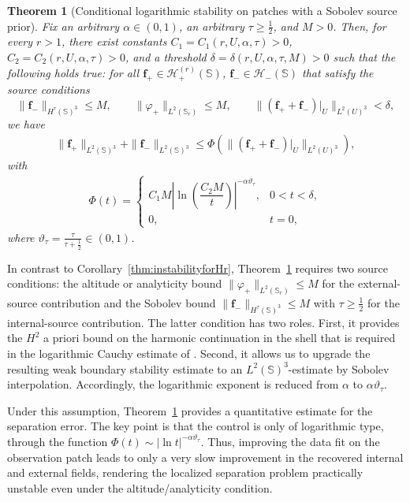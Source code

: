 \documentclass[a4paper, 11pt]{article}
\newtheorem{theorem}{Theorem}
\renewcommand{\SS}{\mathbb{S}}
\newcommand{\f}{\mathbf{f}}
\begin{document}
\begin{theorem}[Conditional logarithmic stability on patches with a Sobolev source prior] \label{thm:condstab}
{
	Fix an arbitrary $\alpha\in(0,1)$, an arbitrary $\tau\geq\frac12$, and $M>0$. Then, for every $r>1$, there exist constants $C_1=C_1(r,U,\alpha,\tau)>0$, $C_2=C_2(r,U,\alpha,\tau)>0$, and a threshold $\delta=\delta(r,U,\alpha,\tau,M)>0$ such that the following holds true:
    for all $\f_+\in \mathcal H_+^{(r)}(\SS)$, $\f_-\in \mathcal H_-(\SS)$ that satisfy the source conditions
	\[
		\|\f_-\|_{H^\tau(\SS)^3}\le M,
		\qquad
		\|\varphi_+\|_{L^2(\SS_r)}\le M,
		\qquad
		\|(\f_+ + \f_-)|_U\|_{L^2(U)^3}<\delta,
	\]
	we have
	\begin{align}
		\|\f_+\|_{L^2(\SS)^3}+\|\f_-\|_{L^2(\SS)^3}
		\le \Phi\left(\|(\f_+ + \f_-)|_U\|_{L^2(U)^3}\right),\label{eqn:logstab}
	\end{align}
	with
	\begin{align}
		\Phi(t)=
		\begin{cases}
		C_1 M\left|\ln\left(\dfrac{C_2 M}{t}\right)\right|^{-\alpha\vartheta_\tau},
		& 0<t<\delta,\\[0.3em]
		0, & t=0,
		\end{cases}
		\label{eqn:logstab2}
	\end{align}
	where $\vartheta_\tau=\frac{\tau}{\tau+\frac12}\in(0,1)$.
}
\end{theorem}

In contrast to Corollary~\ref{thm:instabilityforHr}, Theorem~\ref{thm:condstab} requires two source conditions: the altitude or analyticity bound $\|\varphi_+\|_{L^2(\SS_r)}\leq M$ for the external-source contribution and the Sobolev bound $\|\f_-\|_{H^\tau(\SS)^3}\leq M$ with $\tau\geq\frac12$ for the internal-source contribution. The latter condition has two roles. First, it provides the $H^2$ a priori bound on the harmonic continuation in the shell that is required in the logarithmic Cauchy estimate of \cite[Cor.~2.1]{bou10}. Second, it allows us to upgrade the resulting weak boundary stability estimate to an $L^2(\SS)^3$-estimate by Sobolev interpolation. Accordingly, the logarithmic exponent is reduced from $\alpha$ to $\alpha\vartheta_\tau$. 

Under this assumption, Theorem~\ref{thm:condstab} provides a quantitative estimate for the separation error. The key point is that the control is only of logarithmic type, through the function $\Phi(t)\sim |\ln t|^{-\alpha\vartheta_\tau}$. Thus, improving the data fit on the observation patch leads to only a very slow improvement in the recovered internal and external fields, rendering the localized separation problem practically unstable even under the altitude/analyticity condition.
\end{document}
